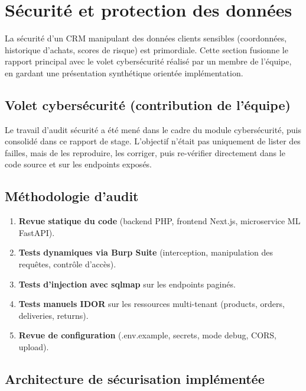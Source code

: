 \documentclass[12pt,a4paper]{report}
\begin{document}
\section{S\'{e}curit\'{e} et protection des donn\'{e}es}

La s\'{e}curit\'{e} d'un CRM manipulant des donn\'{e}es clients sensibles (coordonn\'{e}es, historique d'achats, scores de risque) est primordiale. Cette section fusionne le rapport principal avec le volet cybers\'{e}curit\'{e} r\'{e}alis\'{e} par un membre de l'\'{e}quipe, en gardant une pr\'{e}sentation synth\'{e}tique orient\'{e}e impl\'{e}mentation.

\subsection{Volet cybers\'{e}curit\'{e} (contribution de l'\'{e}quipe)}

Le travail d'audit s\'{e}curit\'{e} a \'{e}t\'{e} men\'{e} dans le cadre du module cybers\'{e}curit\'{e}, puis consolid\'{e} dans ce rapport de stage. L'objectif n'\'{e}tait pas uniquement de lister des failles, mais de les reproduire, les corriger, puis re-v\'{e}rifier directement dans le code source et sur les endpoints expos\'{e}s.

\subsection{M\'{e}thodologie d'audit}

\begin{enumerate}
  \item \textbf{Revue statique du code} (backend PHP, frontend Next.js, microservice ML FastAPI).
  \item \textbf{Tests dynamiques via Burp Suite} (interception, manipulation des requ\^{e}tes, contr\^{o}le d'acc\`{e}s).
  \item \textbf{Tests d'injection avec sqlmap} sur les endpoints pagin\'{e}s.
  \item \textbf{Tests manuels IDOR} sur les ressources multi-tenant (products, orders, deliveries, returns).
  \item \textbf{Revue de configuration} (.env.example, secrets, mode debug, CORS, upload).
\end{enumerate}

\subsection{Architecture de s\'{e}curisation impl\'{e}ment\'{e}e}
\end{document}
